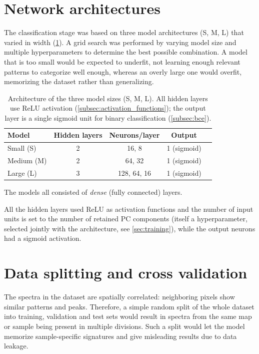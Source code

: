 \section{Network architectures}
\label{sec:architectures}

The classification stage was based on three model architectures (S, M, L) that varied in width (\cref{tab:architectures}). A grid search was performed by varying model size and multiple hyperparameters to determine the best possible combination. A model that is too small would be expected to underfit, not learning enough relevant patterns to categorize well enough, whereas an overly large one would overfit, memorizing the dataset rather than generalizing.

\begin{table}[ht]
    \centering
    \small
    \begin{tabular}{|l|c|c|c|c|}
        \hline
        \textbf{Model} & \textbf{Hidden layers} & \textbf{Neurons/layer} & \textbf{Output} \\
        \hline
        Small (S)  & 2 & 16, 8 & 1 (sigmoid) \\
        Medium (M) & 2 & 64, 32 & 1 (sigmoid) \\
        Large (L)  & 3 & 128, 64, 16 & 1 (sigmoid) \\
        \hline
    \end{tabular}
    \caption{Architecture of the three model sizes (S, M, L). All hidden layers use ReLU activation (\cref{subsec:activation_functions}); the output layer is a single sigmoid unit for binary classification (\cref{subsec:bce}).}
    \label{tab:architectures}
\end{table}

The models all consisted of \textit{dense} (fully connected) layers.

All the hidden layers used ReLU as activation functions and the number of input units is set to the number of retained PC components (itself a hyperparameter, selected jointly with the architecture, see \cref{sec:training}), while the output neurons had a sigmoid activation.


\section{Data splitting and cross validation}
\label{sec:data_splitting}

The spectra in the dataset are spatially correlated: neighboring pixels show similar patterns and peaks. Therefore, a simple random split of the whole dataset into training, validation and test sets would result in spectra from the same map or sample being present in multiple divisions. Such a split would let the model memorize sample-specific signatures and give misleading results due to data leakage.

